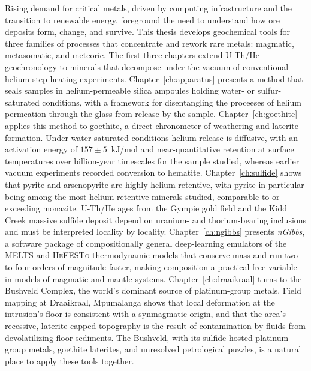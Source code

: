 %
%      
%
%

Rising demand for critical metals, driven by computing infrastructure and the
transition to renewable energy, foreground the need to understand how ore deposits form,
change, and survive. This thesis develops geochemical tools for three families of
processes that concentrate and rework rare metals: magmatic, metasomatic, and
meteoric. The first three chapters extend U-Th/He geochronology to minerals that
decompose under the vacuum of conventional helium step-heating experiments.
Chapter~\ref{ch:apparatus} presents a method that seals samples in helium-permeable
silica ampoules holding water- or sulfur-saturated conditions, with a framework for
disentangling the proceeses of helium permeation through the glass from release by the sample.
Chapter~\ref{ch:goethite} applies this method to goethite, a direct chronometer of weathering
and laterite formation. Under water-saturated conditions helium release is diffusive,
with an activation energy of $157 \pm 5$~kJ/mol and near-quantitative retention at
surface temperatures over billion-year timescales for the sample studied, whereas
earlier vacuum experiments recorded conversion to hematite.
Chapter~\ref{ch:sulfide} shows that pyrite and arsenopyrite are highly helium retentive, with pyrite in particular being among the most
helium-retentive minerals studied, comparable to or exceeding monazite. 
U-Th/He ages from the Gympie gold field and the Kidd Creek
massive sulfide deposit depend on uranium- and thorium-bearing inclusions and must be
interpreted locality by locality.
Chapter~\ref{ch:ngibbs} presents \emph{nGibbs}, a software package of compositionally general deep-learning emulators of the
\textsc{MELTS} and \textsc{HeFESTo} thermodynamic models that conserve mass and run
two to four orders of magnitude faster, making composition a practical free variable
in models of magmatic and mantle systems.
Chapter~\ref{ch:draaikraal} turns to the Bushveld Complex, the world's dominant source
of platinum-group metals. Field mapping at Draaikraal, Mpumalanga shows that local deformation at the 
intrusion's floor is consistent with a synmagmatic origin, and that the area's recessive,
laterite-capped topography is the result of contamination by fluids from devolatilizing floor
sediments. The Bushveld, with its sulfide-hosted platinum-group metals, goethite
laterites, and unresolved petrological puzzles, is a natural place to apply these tools
together.
